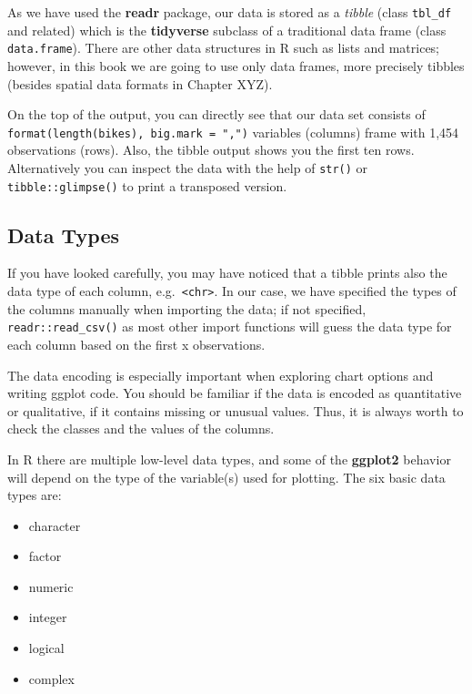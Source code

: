 \documentclass[
]{krantz}
\providecommand{\tightlist}{%
  \setlength{\itemsep}{0pt}\setlength{\parskip}{0pt}}
\begin{document}
As we have used the \textbf{readr} package, our data is stored as a \emph{tibble} (class \texttt{tbl\_df} and related) which is the \textbf{tidyverse} subclass of a traditional data frame (class \texttt{data.frame}). There are other data structures in R such as lists and matrices; however, in this book we are going to use only data frames, more precisely tibbles (besides spatial data formats in Chapter XYZ).

On the top of the output, you can directly see that our data set consists of \texttt{format(length(bikes),\ big.mark\ =\ ",")} variables (columns) frame with 1,454 observations (rows). Also, the tibble output shows you the first ten rows. Alternatively you can inspect the data with the help of \texttt{str()} or \texttt{tibble::glimpse()} to print a transposed version.

\hypertarget{classes}{%
\subsection{Data Types}\label{classes}}

If you have looked carefully, you may have noticed that a tibble prints also the data type of each column, e.g.~\texttt{\textless{}chr\textgreater{}}. In our case, we have specified the types of the columns manually when importing the data; if not specified, \texttt{readr::read\_csv()} as most other import functions will guess the data type for each column based on the first x observations.

The data encoding is especially important when exploring chart options and writing ggplot code. You should be familiar if the data is encoded as quantitative or qualitative, if it contains missing or unusual values. Thus, it is always worth to check the classes and the values of the columns.

In R there are multiple low-level data types, and some of the \textbf{ggplot2} behavior will depend on the type of the variable(s) used for plotting. The six basic data types are:

\begin{itemize}
\tightlist
\item
  character
\item
  factor
\item
  numeric
\item
  integer
\item
  logical
\item
  complex
\end{itemize}
\end{document}
